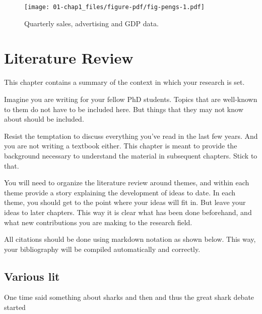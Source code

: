 \documentclass[12pt]{report}
\begin{document}
\begin{figure}

{\centering \texttt{[image: 01-chap1\_files/figure-pdf/fig-pengs-1.pdf]}

}

\caption{\label{fig-pengs}Quarterly sales, advertising and GDP data.}

\end{figure}


\hypertarget{literature-review}{%
\chapter{Literature Review}\label{literature-review}}

This chapter contains a summary of the context in which your research is
set.

Imagine you are writing for your fellow PhD students. Topics that are
well-known to them do not have to be included here. But things that they
may not know about should be included.

Resist the temptation to discuss everything you've read in the last few
years. And you are not writing a textbook either. This chapter is meant
to provide the background necessary to understand the material in
subsequent chapters. Stick to that.

You will need to organize the literature review around themes, and
within each theme provide a story explaining the development of ideas to
date. In each theme, you should get to the point where your ideas will
fit in. But leave your ideas to later chapters. This way it is clear
what has been done beforehand, and what new contributions you are making
to the research field.

All citations should be done using markdown notation as shown below.
This way, your bibliography will be compiled automatically and
correctly.

\hypertarget{various-lit}{%
\section{Various lit}\label{various-lit}}

One time \textcite{achenBlindRetrospectionElectoral2002} said something
about sharks and then \textcite{fowlerSharkAttacksInfluence2018} and
thus the great shark debate started

{}

\newpage



		\printbibliography
		
\end{document}
